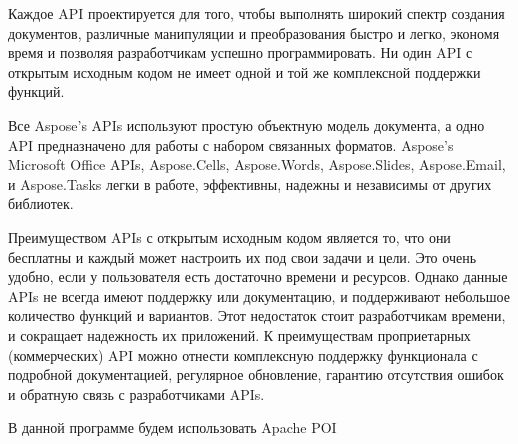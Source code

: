 Каждое API проектируется для того, чтобы выполнять широкий спектр создания документов, различные манипуляции и преобразования быстро и легко, экономя время и позволяя разработчикам успешно программировать. Ни один API с открытым исходным кодом не имеет одной и той же комплексной поддержки функций.

Все Aspose’s APIs используют простую объектную модель документа, а одно API предназначено для работы с набором связанных форматов. Aspose’s Microsoft Office APIs, Aspose.Cells, Aspose.Words, Aspose.Slides, Aspose.Email, и Aspose.Tasks легки в работе, эффективны, надежны и независимы от других библиотек.

Преимуществом APIs с открытым исходным кодом является то, что они бесплатны и каждый может настроить их под свои задачи и цели. Это очень удобно, если у пользователя есть достаточно времени и ресурсов. Однако данные APIs не всегда имеют поддержку или документацию, и поддерживают небольшое количество функций и вариантов. Этот недостаток стоит разработчикам времени, и сокращает надежность их приложений. К преимуществам проприетарных (коммерческих) API можно отнести комплексную поддержку функционала с подробной документацией, регулярное обновление, гарантию отсутствия ошибок и обратную связь с разработчиками APIs.

В данной программе будем использовать Apache POI



